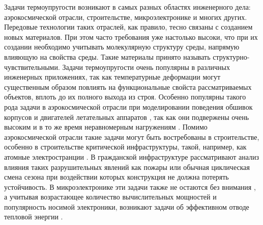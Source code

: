 
{\actuality}
\ifsynopsis
Задачи термоупругости возникают в самых разных областях инженерного дела: аэрокосмической отрасли, строительстве, микроэлектронике и многих других. Передовые технологии таких отраслей, как правило, тесно связаны с созданием новых материалов. При этом часто требования уже настолько высоки, что при их создании необходимо учитывать молекулярную структуру среды, напрямую влияющую на свойства среды. Такие материалы принято называть структурно-чувствительными.
\else
Задачи термоупругости очень популярны в различных инженерных приложениях, так как температурные деформации могут существенным образом повлиять на функциональные свойста рассматриваемых объектов, вплоть до их полного выхода из строя. Особенно популярны такого рода задачи в аэрокосмической отрасли при моделировании поведения обшивок корпусов и двигателей летательных аппаратов \cite{Aerocosmos1, Aerocosmos2, Aerocosmos3}, так как они подвержены очень высоким и в то же время неравномерным нагружениям \cite{Aerocosmos4, Aerocosmos5, Aerocosmos6, Aerocosmos7}. Помимо аэрокосмической отрасли такие задачи могут быть востребованы в строительстве, особенно в строительстве критической инфраструктуры, такой, например, как атомные электространции \cite{StroyMech1, StroyMech2}. В гражданской инфраструктуре рассматривают анализ влияния таких разрушительных явлений как пожары \cite{StroyMech3, StroyMech4} или обычная циклическая смена сезона \cite{StroyMech5, StroyMech6} при воздействии которых конструкция не должна потерять устойчивость. В микроэлектронике эти задачи также не остаются без внимания \cite{MicroElectronic1, MicroElectronic2}, а учитывая возрастающее количество вычислительных мощностей и популярность носимой электроники, возникают задачи об эффективном отводе тепловой энергии \cite{MicroElectronic3}.
\fi


